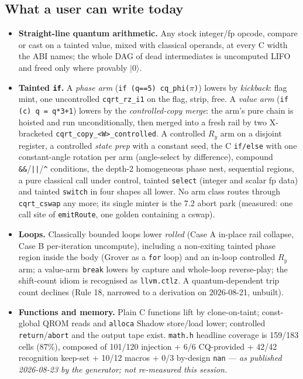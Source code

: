 \subsection*{What a user can write today}
\begin{itemize}
  \item \textbf{Straight-line quantum arithmetic.} Any stock integer/fp opcode, compare or cast on
    a tainted value, mixed with classical operands, at every C width the ABI names; the whole DAG of
    dead intermediates is uncomputed LIFO and freed only where provably \(|0\rangle\).
  \item \textbf{Tainted \texttt{if}.} A \emph{phase arm} (\texttt{if (q==5) cq\_phi(}\(\pi\)\texttt{)})
    lowers by \emph{kickback}: flag mint, one uncontrolled \texttt{cqrt\_rz\_i1} on the flag, strip,
    free. A \emph{value arm} (\texttt{if (c) q = q*3+1}) lowers by the \emph{controlled-copy merge}:
    the arm's pure chain is hoisted and run unconditionally, then merged into a fresh rail by two
    X-bracketed \texttt{cqrt\_copy\_<W>\_controlled}. A controlled \(R_y\) arm on a disjoint register,
    a controlled \emph{state prep} with a constant seed, the C \texttt{if/else} with one constant-angle
    rotation per arm (angle-select by difference), compound \texttt{\&\&}/\texttt{||}/\texttt{\^{}}
    conditions, the depth-2 homogeneous phase nest, sequential regions, a pure classical call under
    control, tainted \texttt{select} (integer and scalar fp data) and tainted \texttt{switch} in four
    shapes all lower. No arm class routes through \texttt{cqrt\_cswap} any more; its single minter is
    the 7.2 abort park (measured: one call site of \texttt{emitRoute}, one golden containing a cswap).
  \item \textbf{Loops.} Classically bounded loops lower \emph{rolled} (Case A in-place rail collapse,
    Case B per-iteration uncompute), including a non-exiting tainted phase region inside the body
    (Grover as a \texttt{for} loop) and an in-loop controlled \(R_y\) arm; a value-arm \texttt{break}
    lowers by capture and whole-loop reverse-play; the shift-count idiom is recognised as
    \texttt{llvm.ctlz}. A quantum-dependent trip count declines (Rule 18, narrowed to a derivation
    on 2026-08-21, unbuilt).
  \item \textbf{Functions and memory.} Plain C functions lift by clone-on-taint; const-global QROM
    reads and \texttt{alloca} Shadow store/load lower; controlled \texttt{return}/\texttt{abort} and
    the output tape exist. \texttt{math.h} headline coverage is 159/183 cells (87\%), composed of
    101/120 injection + 6/6 CQ-provided + 42/42 recognition keep-set + 10/12 macros + 0/3 by-design
    \texttt{nan} --- \emph{as published 2026-08-23 by the generator; not re-measured this session.}
\end{itemize}

